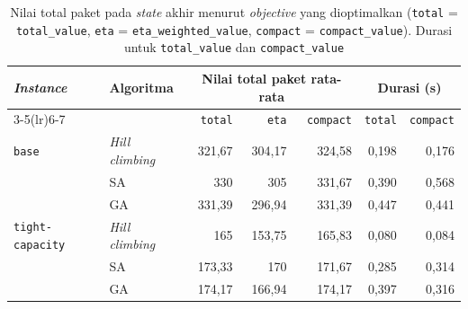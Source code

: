 \begin{table}[H]
    \centering
    \small
    \begin{tabular}{@{}llrrrrr@{}}
        \toprule
        \textit{Instance}       & Algoritma              & \multicolumn{3}{c}{Nilai total paket rata-rata} & \multicolumn{2}{c}{Durasi (s)}                                                        \\
        \cmidrule(lr){3-5}\cmidrule(lr){6-7}
                                &                        & \texttt{total}                                  & \texttt{eta}                   & \texttt{compact} & \texttt{total} & \texttt{compact} \\
        \midrule
        \texttt{base}           & \textit{Hill climbing} & 321,67                                          & 304,17                         & 324,58           & 0,198          & 0,176            \\
                                & SA                     & 330                                             & 305                            & 331,67           & 0,390          & 0,568            \\
                                & GA                     & 331,39                                          & 296,94                         & 331,39           & 0,447          & 0,441            \\
        \midrule
        \texttt{tight-capacity} & \textit{Hill climbing} & 165                                             & 153,75                         & 165,83           & 0,080          & 0,084            \\
                                & SA                     & 173,33                                          & 170                            & 171,67           & 0,285          & 0,314            \\
                                & GA                     & 174,17                                          & 166,94                         & 174,17           & 0,397          & 0,316            \\
        \bottomrule
    \end{tabular}
    \caption{Nilai total paket pada \textit{state} akhir menurut \textit{objective} yang dioptimalkan (\texttt{total} = \texttt{total\_value}, \texttt{eta} = \texttt{eta\_weighted\_value}, \texttt{compact} = \texttt{compact\_value}). Durasi untuk \texttt{total\_value} dan \texttt{compact\_value}}
    \label{tab:objective}
\end{table}


